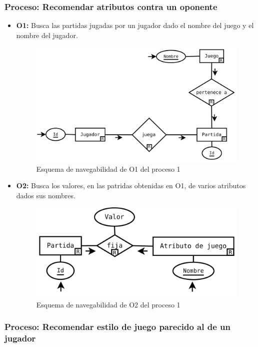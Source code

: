 \subsubsection{Proceso: Recomendar atributos contra un oponente}

\begin{itemize}
	\item \textbf{O1:} Busca las partidas jugadas por un jugador dado el nombre del juego y
		el nombre del jugador.\\

	\begin{figure}[H]
		\centering
		\includegraphics[width=0.5\linewidth]{../Diagramas/pdf/Op1-1.pdf}
		\caption{Esquema de navegabilidad de O1 del proceso 1}
	\end{figure}

	\item \textbf{O2:} Busca los valores, en las patridas obtenidas
		en O1, de varios atributos dados sus nombres.\\

	\begin{figure}[H]
		\centering
		\includegraphics[width=0.5\linewidth]{../Diagramas/pdf/Op1-2.pdf}
		\caption{Esquema de navegabilidad de O2 del proceso 1}
	\end{figure}
\end{itemize}



\subsubsection{Proceso: Recomendar estilo de juego parecido al de un jugador}

